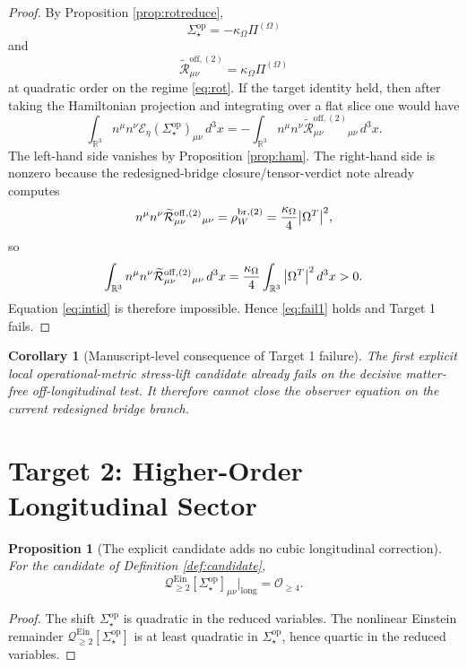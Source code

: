 \documentclass[11pt]{article}
\newcommand{\PiOmega}{\Pi^{(\Omega)}}
\newcommand{\SigmaOpStar}{\Sigma^{\mathrm{op}}_\star}
\newcommand{\ReOffTwo}{\widetilde{\mathcal R}_{\mu\nu}^{\mathrm{off},(2)}}
\newcommand{\EinLinFlat}{\mathcal E_{\eta}}
\newcommand{\EinQuad}{\mathcal Q_{\ge 2}^{\mathrm{Ein}}}
\newtheorem{proposition}{Proposition}
\newtheorem{corollary}{Corollary}
\begin{document}
\begin{proof}
By Proposition \ref{prop:rotreduce},
\[
\SigmaOpStar=-\kappa_\Omega\PiOmega
\]
and
\[
\ReOffTwo=\kappa_\Omega\PiOmega
\]
at quadratic order on the regime \eqref{eq:rot}. If the target identity held, then after taking the Hamiltonian projection and integrating over a flat slice one would have
\begin{equation}
\int_{\mathbb R^3}
n^\mu n^\nu\EinLinFlat(\SigmaOpStar)_{\mu\nu}\,d^3x
=
-\int_{\mathbb R^3}
n^\mu n^\nu\ReOffTwo{}_{\mu\nu}\,d^3x.
\label{eq:intid}
\end{equation}
The left-hand side vanishes by Proposition \ref{prop:ham}. The right-hand side is nonzero because the redesigned-bridge closure/tensor-verdict note already computes
\[
n^\mu n^\nu\ReOffTwo{}_{\mu\nu}
=
\rho_W^{\mathrm{br},(2)}
=
\frac{\kappa_\Omega}{4}\abs{\Omega^T}^2,
\]
so
\begin{equation}
\int_{\mathbb R^3}
n^\mu n^\nu\ReOffTwo{}_{\mu\nu}\,d^3x
=
\frac{\kappa_\Omega}{4}
\int_{\mathbb R^3}\abs{\Omega^T}^2\,d^3x
>0.
\label{eq:pos}
\end{equation}
Equation \eqref{eq:intid} is therefore impossible. Hence \eqref{eq:fail1} holds and Target 1 fails.
\end{proof}

\begin{corollary}[Manuscript-level consequence of Target 1 failure]
\label{cor:target1}
The first explicit local operational-metric stress-lift candidate already fails on the decisive matter-free off-longitudinal test. It therefore cannot close the observer equation on the current redesigned bridge branch.
\end{corollary}

\section{Target 2: Higher-Order Longitudinal Sector}

\begin{proposition}[The explicit candidate adds no cubic longitudinal correction]
\label{prop:nocubic}
For the candidate of Definition \ref{def:candidate},
\begin{equation}
\EinQuad[\SigmaOpStar]_{\mu\nu}\Big|_{\mathrm{long}}
=
\mathcal O_{\ge 4}.
\label{eq:nocubic}
\end{equation}
\end{proposition}

\begin{proof}
The shift \(\SigmaOpStar\) is quadratic in the reduced variables. The nonlinear Einstein remainder \(\EinQuad[\SigmaOpStar]\) is at least quadratic in \(\SigmaOpStar\), hence quartic in the reduced variables.
\end{proof}
\end{document}
